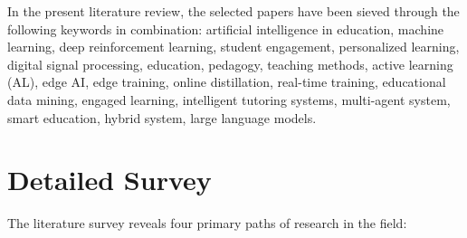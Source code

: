 In the present literature review, the selected papers have been sieved through the following keywords in combination: artificial intelligence in education, machine learning, deep reinforcement learning, student engagement, personalized learning, digital signal processing, education, pedagogy, teaching methods, active learning (AL), edge AI, edge training, online distillation, real-time training, educational data mining, engaged learning, intelligent tutoring systems, multi-agent system, smart education, hybrid system, large language models.

\section{Detailed Survey}


The literature survey reveals four primary paths of research in the field:

